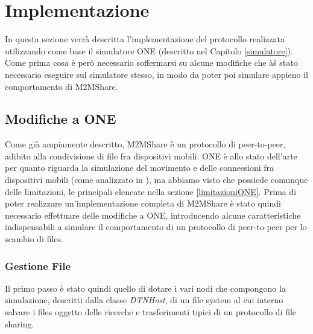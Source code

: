 
\chapter{Implementazione}\label{implementazione} %



\graphicspath{{6-implementazione/img/}}


In questa sezione verrà  descritta l'implementazione del protocollo realizzata utilizzando come base il simulatore ONE (descritto nel Capitolo \ref{simulatore}). Come prima cosa è però necessario soffermarsi su alcune modifiche che àš stato necessario eseguire sul simulatore stesso, in modo da poter poi simulare appieno il comportamento di M2MShare.

\section{Modifiche a ONE}
Come già  ampiamente descritto, M2MShare è un protocollo di peer-to-peer, adibito alla condivisione di file fra dispositivi mobili. ONE è allo stato dell'arte per quanto riguarda la simulazione del movimento e delle connessioni fra dispositivi mobili (come analizzato in \cite{panelStateDTNEvaluation}), ma abbiamo visto che possiede comunque delle limitazioni, le principali elencate nella sezione \ref{limitazioniONE}. Prima di poter realizzare un'implementazione completa di M2MShare è stato quindi necessario effettuare delle modifiche a ONE, introducendo alcune caratteristiche indispensabili a simulare il comportamento di un protocollo di peer-to-peer per lo scambio di files.

\subsection{Gestione File}
Il primo passo è stato quindi quello di dotare i vari nodi che compongono la simulazione, descritti dalla classe \textit{DTNHost}, di un file system al cui interno salvare i files oggetto delle ricerche e trasferimenti tipici di un protocollo di file sharing.

